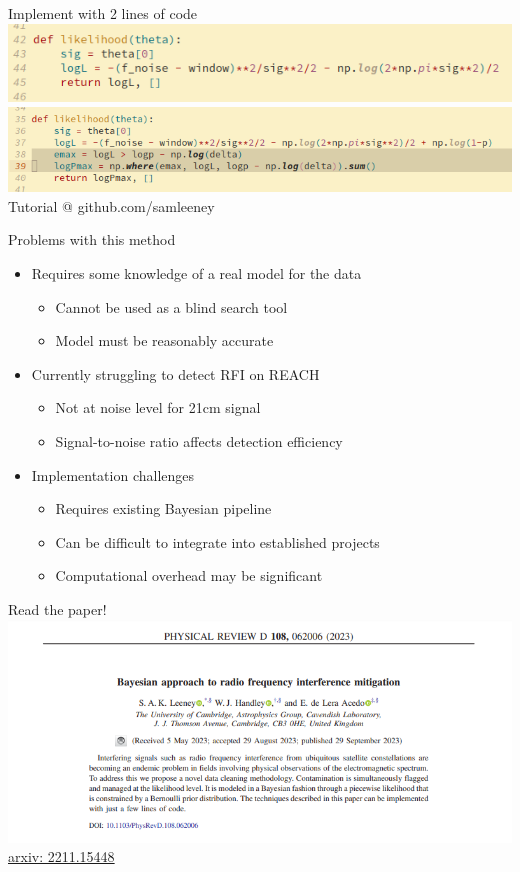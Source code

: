 \documentclass[aspectratio=169]{beamer}
\begin{document}
\begin{frame}{Implement with 2 lines of code}
    \includegraphics[width=1\textwidth]{images/logl1.png}
    \includegraphics[width=1\textwidth]{images/logl2.png}
    \centering Tutorial @ github.com/samleeney
\end{frame}

\begin{frame}{Problems with this method}
    \begin{itemize}
        \item Requires some knowledge of a real model for the data
        \begin{itemize}
            \item Cannot be used as a blind search tool
            \item Model must be reasonably accurate
        \end{itemize}
        \item Currently struggling to detect RFI on REACH
        \begin{itemize}
            \item Not at noise level for 21cm signal
            \item Signal-to-noise ratio affects detection efficiency
        \end{itemize}
        \item Implementation challenges
        \begin{itemize}
            \item Requires existing Bayesian pipeline
            \item Can be difficult to integrate into established projects
            \item Computational overhead may be significant
        \end{itemize}
    \end{itemize}
\end{frame}

\begin{frame}{Read the paper!}
  \includegraphics[width=1\textwidth]{images/paper1.png}
  \href{https://arxiv.org/abs/2211.15448}{arxiv: 2211.15448}
\end{frame}
\end{document}
